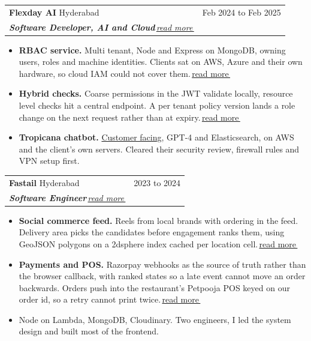 \documentclass[a4paper,9pt]{article}
\makeatletter
\newenvironment{rItems}{
  \begin{itemize}[nosep, after=\strut, leftmargin=1.2em, itemsep=2pt, topsep=2pt]
}{
  \end{itemize}
}
\newcommand{\role}[4]{%
  \begin{tabularx}{\linewidth}{@{}X r@{}}
    \color[HTML]{1C033C}\textbf{#1} {\small #2} & \color[HTML]{371e77}\small{#4}\\[1pt]
    \color[HTML]{371e77}\textit{#3} &
  \end{tabularx}%
}
\newcommand{\more}[1]{\,\href{#1}{\footnotesize read more\,\faExternalLinkAlt}}
\makeatother
\begin{document}
\role{Flexday AI}{Hyderabad}{\textbf{Software Developer, AI and Cloud}\more{https://rishavraj.info/projects/rbac.html}}{Feb 2024 to Feb 2025}
\begin{rItems}
  \item \textbf{RBAC service.} Multi tenant, Node and Express on MongoDB, owning users, roles and machine identities. Clients sat on AWS, Azure and their own hardware, so cloud IAM could not cover them.\more{https://rishavraj.info/projects/rbac.html\#why}
  \item \textbf{Hybrid checks.} Coarse permissions in the JWT validate locally, resource level checks hit a central endpoint. A per tenant policy version lands a role change on the next request rather than at expiry.\more{https://rishavraj.info/projects/rbac.html\#check}
  \item \textbf{Tropicana chatbot.} \href{https://www.tropicanabrandsgroup.com/contactus/}{Customer facing}, GPT-4 and Elasticsearch, on AWS and the client's own servers. Cleared their security review, firewall rules and VPN setup first.
\end{rItems}

\vspace{3pt}

\role{Fastail}{Hyderabad}{\textbf{Software Engineer}\more{https://rishavraj.info/projects/fastail.html}}{2023 to 2024}
\begin{rItems}
  \item \textbf{Social commerce feed.} Reels from local brands with ordering in the feed. Delivery area picks the candidates before engagement ranks them, using GeoJSON polygons on a 2dsphere index cached per location cell.\more{https://rishavraj.info/projects/fastail.html\#feed}
  \item \textbf{Payments and POS.} Razorpay webhooks as the source of truth rather than the browser callback, with ranked states so a late event cannot move an order backwards. Orders push into the restaurant's Petpooja POS keyed on our order id, so a retry cannot print twice.\more{https://rishavraj.info/projects/fastail.html\#payments}
  \item Node on Lambda, MongoDB, Cloudinary. Two engineers, I led the system design and built most of the frontend.
\end{rItems}

\end{document}

